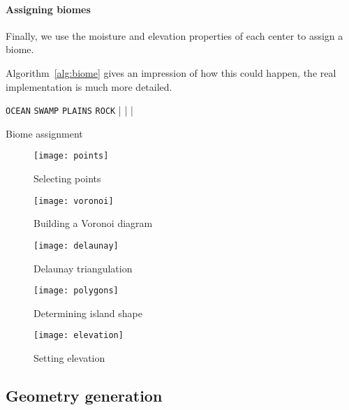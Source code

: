 \paragraph{Assigning biomes}

Finally, we use the moisture and elevation properties of each center to assign a biome.

Algorithm~\ref{alg:biome} gives an impression of how this could happen, the real implementation is much more detailed.

\begin{algo}[H]
\begin{sourcecode}
	\return \texttt{OCEAN}
\qelse
		\return \texttt{SWAMP}
	\qelse
			\return \texttt{PLAINS}
		\qelse
			\return \texttt{ROCK}
		|
	|
|
\qend
\end{sourcecode}
	\caption{Biome assignment}
	\label{alg:biome}
\end{algo}

\begin{figure}
	\centering
	\texttt{[image: points]}
	\caption{Selecting points}
	\label{fig:algo:points}
\end{figure}

\begin{figure}
	\centering
	\texttt{[image: voronoi]}
	\caption{Building a Voronoi diagram}
	\label{fig:algo:voronoi}
\end{figure}

\begin{figure}
	\centering
	\texttt{[image: delaunay]}
	\caption{Delaunay triangulation}
	\label{fig:algo:delaunay}
\end{figure}

\begin{figure}
	\centering
	\texttt{[image: polygons]}
	\caption{Determining island shape}
	\label{fig:algo:polygons}
\end{figure}

\begin{figure}
	\centering
	\texttt{[image: elevation]}
	\caption{Setting elevation}
	\label{fig:algo:elevation}
\end{figure}


\subsection{Geometry generation}

